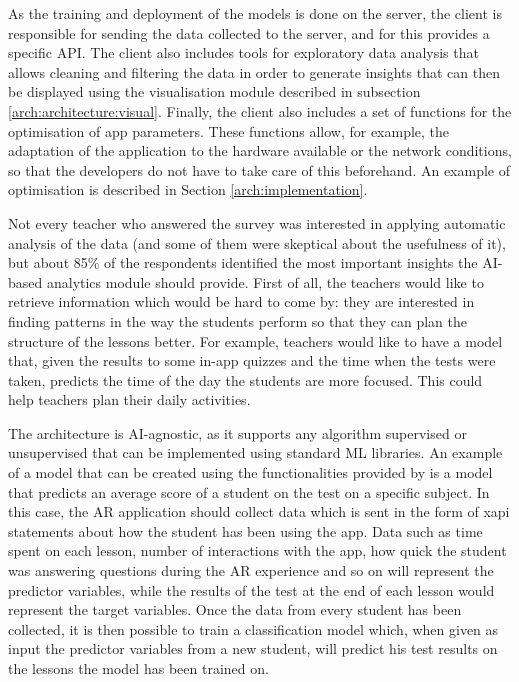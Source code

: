 As the training and deployment of the models is done on the server, the client is responsible for sending the data collected to the server, and for this \arch{} provides a specific API. The client also includes tools for exploratory data analysis that allows cleaning and filtering the data in order to generate insights that can then be displayed using the visualisation module described in subsection \ref{arch:architecture:visual}. Finally, the client also includes a set of functions for the optimisation of app parameters. These functions allow, for example, the adaptation of the application to the hardware available or the network conditions, so that the developers do not have to take care of this beforehand. An example of optimisation is described in Section \ref{arch:implementation}.

Not every teacher who answered the survey was interested in applying automatic analysis of the data (and some of them were skeptical about the usefulness of it), but about 85\% of the respondents identified the most important insights the AI-based analytics module should provide. First of all, the teachers would like to retrieve information which would be hard to come by: they are interested in finding patterns in the way the students perform so that they can plan the structure of the lessons better. For example, teachers would like to have a model that, given the results to some in-app quizzes and the time when the tests were taken, predicts the time of the day the students are more focused. This could help teachers plan their daily activities.

The architecture is AI-agnostic, as it supports any algorithm \textendash{} supervised or unsupervised \textendash{} that can be implemented using standard ML libraries. An example of a model that can be created using the functionalities provided by \arch{} is a model that predicts an average score of a student on the test on a specific subject. In this case, the AR application should collect data \textendash{}which is sent in the form of \gls{xapi} statements \citep{xAPIspec} \textendash{} about how the student has been using the app. Data such as time spent on each lesson, number of interactions with the app, how quick the student was answering questions during the AR experience and so on will represent the predictor variables, while the results of the test at the end of each lesson would represent the target variables. Once the data from every student has been collected, it is then possible to train a classification model which, when given as input the predictor variables from a new student, will predict his test results on the lessons the model has been trained on.

